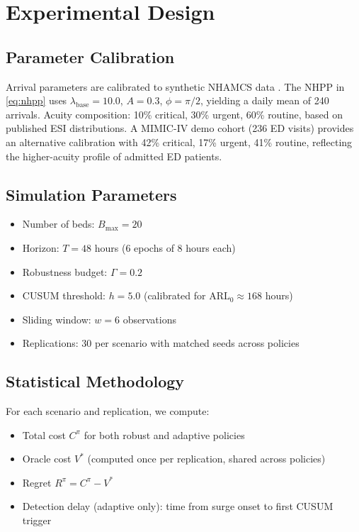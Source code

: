 \documentclass[11pt,twocolumn]{article}
\theoremstyle{plain}
\theoremstyle{definition}
\begin{document}
\section{Experimental Design}

\subsection{Parameter Calibration}

Arrival parameters are calibrated to synthetic NHAMCS data \cite{johnson2023mimic}. The NHPP in \eqref{eq:nhpp} uses $\lambda_{\text{base}} = 10.0$, $A = 0.3$, $\phi = \pi/2$, yielding a daily mean of 240 arrivals. Acuity composition: 10\% critical, 30\% urgent, 60\% routine, based on published ESI distributions. A MIMIC-IV demo cohort (236 ED visits) provides an alternative calibration with 42\% critical, 17\% urgent, 41\% routine, reflecting the higher-acuity profile of admitted ED patients.

\subsection{Simulation Parameters}

\begin{itemize}
\item Number of beds: $B_{\max} = 20$
\item Horizon: $T = 48$ hours (6 epochs of 8 hours each)
\item Robustness budget: $\Gamma = 0.2$
\item CUSUM threshold: $h = 5.0$ (calibrated for $\text{ARL}_0 \approx 168$ hours)
\item Sliding window: $w = 6$ observations
\item Replications: 30 per scenario with matched seeds across policies
\end{itemize}

\subsection{Statistical Methodology}

For each scenario and replication, we compute:
\begin{itemize}
\item Total cost $C^{\pi}$ for both robust and adaptive policies
\item Oracle cost $V^*$ (computed once per replication, shared across policies)
\item Regret $R^{\pi} = C^{\pi} - V^*$
\item Detection delay (adaptive only): time from surge onset to first CUSUM trigger
\end{itemize}
\end{document}
